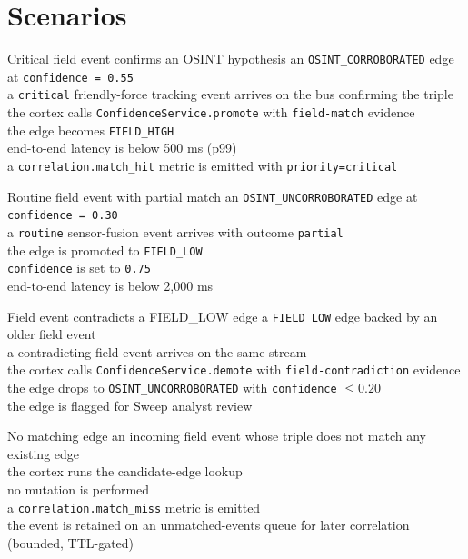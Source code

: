 \section{Scenarios}

\begin{scenario}{Critical field event confirms an OSINT hypothesis}
\Given an \texttt{OSINT\_CORROBORATED} edge at \texttt{confidence = 0.55} \\
\When a \texttt{critical} friendly-force tracking event arrives on the bus confirming the triple \\
\Then the cortex calls \texttt{ConfidenceService.promote} with \texttt{field-match} evidence \\
\And the edge becomes \texttt{FIELD\_HIGH} \\
\And end-to-end latency is below 500 ms (p99) \\
\And a \texttt{correlation.match\_hit} metric is emitted with \texttt{priority=critical}
\end{scenario}

\begin{scenario}{Routine field event with partial match}
\Given an \texttt{OSINT\_UNCORROBORATED} edge at \texttt{confidence = 0.30} \\
\When a \texttt{routine} sensor-fusion event arrives with outcome \texttt{partial} \\
\Then the edge is promoted to \texttt{FIELD\_LOW} \\
\And \texttt{confidence} is set to \texttt{0.75} \\
\And end-to-end latency is below 2{,}000 ms
\end{scenario}

\begin{scenario}{Field event contradicts a FIELD\_LOW edge}
\Given a \texttt{FIELD\_LOW} edge backed by an older field event \\
\When a contradicting field event arrives on the same stream \\
\Then the cortex calls \texttt{ConfidenceService.demote} with \texttt{field-contradiction} evidence \\
\And the edge drops to \texttt{OSINT\_UNCORROBORATED} with \texttt{confidence} $\leq 0.20$ \\
\And the edge is flagged for Sweep analyst review
\end{scenario}

\begin{scenario}{No matching edge}
\Given an incoming field event whose triple does not match any existing edge \\
\When the cortex runs the candidate-edge lookup \\
\Then no mutation is performed \\
\And a \texttt{correlation.match\_miss} metric is emitted \\
\And the event is retained on an unmatched-events queue for later correlation (bounded, TTL-gated)
\end{scenario}

